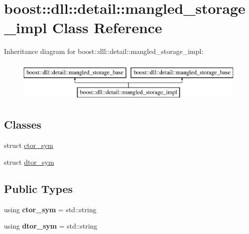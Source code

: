 \hypertarget{a00214}{}\section{boost\+:\+:dll\+:\+:detail\+:\+:mangled\+\_\+storage\+\_\+impl Class Reference}
\label{a00214}
Inheritance diagram for boost\+:\+:dll\+:\+:detail\+:\+:mangled\+\_\+storage\+\_\+impl\+:\begin{figure}[H]
\begin{center}
\leavevmode
\includegraphics[height=2.000000cm]{a00214}
\end{center}
\end{figure}
\subsection*{Classes}
\begin{DoxyCompactItemize}
\item 
struct \hyperlink{a00070}{ctor\+\_\+sym}
\item 
struct \hyperlink{a00079}{dtor\+\_\+sym}
\end{DoxyCompactItemize}
\subsection*{Public Types}
\begin{DoxyCompactItemize}
\item 
using {\bfseries ctor\+\_\+sym} = std\+::string\hypertarget{a00214_af94d7d89e97bb07a0500b440c4e7e0f7}{}\label{a00214_af94d7d89e97bb07a0500b440c4e7e0f7}

\item 
using {\bfseries dtor\+\_\+sym} = std\+::string\hypertarget{a00214_a3fbabc9589b8e863a2af59a0115ed748}{}\label{a00214_a3fbabc9589b8e863a2af59a0115ed748}

\end{DoxyCompactItemize}
